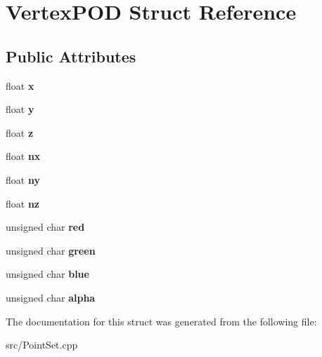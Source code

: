 \hypertarget{structVertexPOD}{\section{Vertex\-P\-O\-D Struct Reference}
\label{structVertexPOD}
}
\subsection*{Public Attributes}
\begin{DoxyCompactItemize}
\item 
\hypertarget{structVertexPOD_a27d4153f7365078e826c573a9d962659}{float {\bfseries x}}\label{structVertexPOD_a27d4153f7365078e826c573a9d962659}

\item 
\hypertarget{structVertexPOD_a05b5f945b46c6532342487fbd29a8efc}{float {\bfseries y}}\label{structVertexPOD_a05b5f945b46c6532342487fbd29a8efc}

\item 
\hypertarget{structVertexPOD_a548cc4e0c09039b75c6658f8279dea70}{float {\bfseries z}}\label{structVertexPOD_a548cc4e0c09039b75c6658f8279dea70}

\item 
\hypertarget{structVertexPOD_a62c5b82a431c00202ac9068d065d35e0}{float {\bfseries nx}}\label{structVertexPOD_a62c5b82a431c00202ac9068d065d35e0}

\item 
\hypertarget{structVertexPOD_a71da241692094a28362e4c1126857465}{float {\bfseries ny}}\label{structVertexPOD_a71da241692094a28362e4c1126857465}

\item 
\hypertarget{structVertexPOD_add129dca519002fa8712b8f87680ee5e}{float {\bfseries nz}}\label{structVertexPOD_add129dca519002fa8712b8f87680ee5e}

\item 
\hypertarget{structVertexPOD_aaa8ca2eb9b18d0d4632dd0e57f7a777c}{unsigned char {\bfseries red}}\label{structVertexPOD_aaa8ca2eb9b18d0d4632dd0e57f7a777c}

\item 
\hypertarget{structVertexPOD_a6938764654a84cce008c9bb79c101665}{unsigned char {\bfseries green}}\label{structVertexPOD_a6938764654a84cce008c9bb79c101665}

\item 
\hypertarget{structVertexPOD_aa25531a8c4cc0114380716b773089095}{unsigned char {\bfseries blue}}\label{structVertexPOD_aa25531a8c4cc0114380716b773089095}

\item 
\hypertarget{structVertexPOD_a3329d953d81ac057bf863bab81f55647}{unsigned char {\bfseries alpha}}\label{structVertexPOD_a3329d953d81ac057bf863bab81f55647}

\end{DoxyCompactItemize}


The documentation for this struct was generated from the following file\-:\begin{DoxyCompactItemize}
\item 
src/Point\-Set.\-cpp\end{DoxyCompactItemize}
